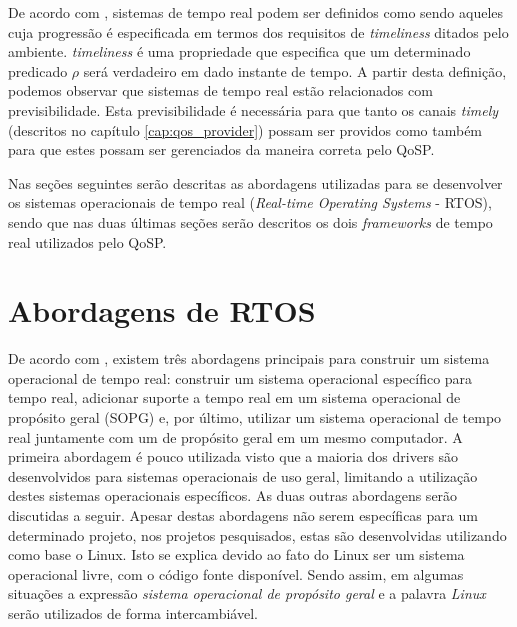 \label{cap:tempo_real}
\acresetall
	
	De acordo com \cite{VERGO01}, sistemas de tempo real podem ser definidos como sendo aqueles cuja progressão é especificada em termos dos requisitos de \textit{timeliness} ditados pelo ambiente. \textit{timeliness} é uma propriedade que especifica que um determinado predicado $ \rho $ será verdadeiro em dado instante de tempo. A partir desta definição, podemos observar que sistemas de tempo real estão relacionados com previsibilidade. Esta previsibilidade é necessária para que tanto os canais \textit{timely} (descritos no capítulo \ref{cap:qos_provider}) possam ser providos como também para que estes possam ser gerenciados da maneira correta pelo QoSP.
	
	Nas seções seguintes serão descritas as abordagens utilizadas para se desenvolver os sistemas operacionais de tempo real (\textit{Real-time Operating Systems} - RTOS), sendo que nas duas últimas seções serão descritos os dois \textit{frameworks} de tempo real utilizados pelo QoSP.
	
\section{Abordagens de RTOS}

	De acordo com \cite{YOBA97}, existem três abordagens principais para construir um sistema operacional de tempo real: construir um sistema operacional específico para tempo real, adicionar suporte a tempo real em um sistema operacional de propósito geral (SOPG) e, por último, utilizar um sistema operacional de tempo real juntamente com um de propósito geral em um mesmo computador. A primeira abordagem é pouco utilizada visto que a maioria dos drivers são desenvolvidos para sistemas operacionais de uso geral, limitando a utilização destes sistemas operacionais específicos. As duas outras abordagens serão discutidas a seguir. Apesar destas abordagens não serem específicas para um determinado projeto, nos projetos pesquisados, estas são desenvolvidas utilizando como base o Linux. Isto se explica devido ao fato do Linux ser um sistema operacional livre, com o código fonte disponível. Sendo assim, em algumas situações a expressão \textit{sistema operacional de propósito geral} e a palavra \textit{Linux} serão utilizados de forma intercambiável.
	
